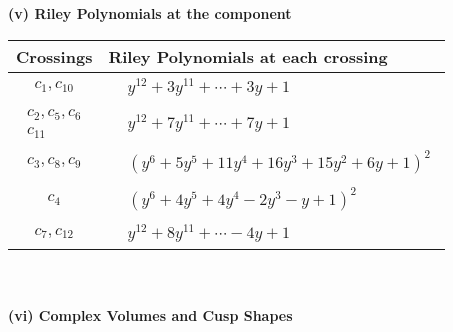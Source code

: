 \documentclass[1p]{elsarticle_modified}
\theoremstyle{definition}
\begin{document}
\flushleft \textbf{(v) Riley Polynomials at the component}\newline \\
\begin{tabular}{m{50pt}|m{274pt}}
Crossings & \hspace{64pt}Riley Polynomials at each crossing \\
\hline $$\begin{aligned}c_{1},c_{10}\end{aligned}$$&$\begin{aligned}
&y^{12}+3 y^{11}+\cdots+3 y+1
\end{aligned}$\\
\hline $$\begin{aligned}c_{2},c_{5},c_{6}\\c_{11}\end{aligned}$$&$\begin{aligned}
&y^{12}+7 y^{11}+\cdots+7 y+1
\end{aligned}$\\
\hline $$\begin{aligned}c_{3},c_{8},c_{9}\end{aligned}$$&$\begin{aligned}
&(y^6+5 y^5+11 y^4+16 y^3+15 y^2+6 y+1)^2
\end{aligned}$\\
\hline $$\begin{aligned}c_{4}\end{aligned}$$&$\begin{aligned}
&(y^6+4 y^5+4 y^4-2 y^3- y+1)^2
\end{aligned}$\\
\hline $$\begin{aligned}c_{7},c_{12}\end{aligned}$$&$\begin{aligned}
&y^{12}+8 y^{11}+\cdots-4 y+1
\end{aligned}$\\
\hline
\end{tabular}\\~\\
\newpage\flushleft \textbf{(vi) Complex Volumes and Cusp Shapes}
\end{document}
